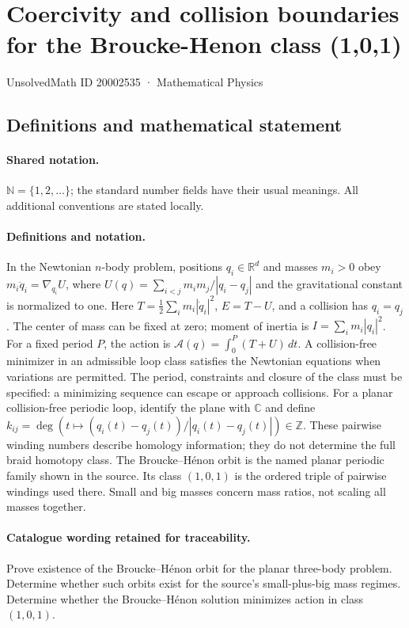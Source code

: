 \documentclass[11pt]{article}
\begin{document}
\setcounter{section}{20002534}
\section{Coercivity and collision boundaries for the Broucke-Henon class (1,0,1)}\label{20002535}
{\small UnsolvedMath ID 20002535 · Mathematical Physics}
\subsection{Definitions and mathematical statement}

\paragraph{Shared notation.}$\mathbb N=\{1,2,\ldots\}$; the standard number fields have their usual meanings. All additional conventions are stated locally.


\paragraph{Definitions and notation.}In the Newtonian $n$-body problem, positions $q_i\in\mathbb R^d$ and masses $m_i>0$ obey $m_i\ddot q_i=\nabla_{q_i}U$, where $U(q)=\sum_{i<j}m_im_j/|q_i-q_j|$ and the gravitational constant is normalized to one. Here $T=\tfrac12\sum_i m_i|\dot q_i|^2$, $E=T-U$, and a collision has $q_i=q_j$. The center of mass can be fixed at zero; moment of inertia is $I=\sum_i m_i|q_i|^2$. For a fixed period $P$, the action is $\mathcal A(q)=\int_0^P(T+U)\,dt$. A collision-free minimizer in an admissible loop class satisfies the Newtonian equations when variations are permitted. The period, constraints and closure of the class must be specified: a minimizing sequence can escape or approach collisions. For a planar collision-free periodic loop, identify the plane with $\mathbb C$ and define $k_{ij}=\deg(t\mapsto(q_i(t)-q_j(t))/|q_i(t)-q_j(t)|)\in\mathbb Z$. These pairwise winding numbers describe homology information; they do not determine the full braid homotopy class. The Broucke--Hénon orbit is the named planar periodic family shown in the source. Its class $(1,0,1)$ is the ordered triple of pairwise windings used there. Small and big masses concern mass ratios, not scaling all masses together.

\paragraph{Catalogue wording retained for traceability.}
Prove existence of the Broucke--Hénon orbit for the planar three-body problem. Determine whether such orbits exist for the source’s small-plus-big mass regimes. Determine whether the Broucke--Hénon solution minimizes action in class $(1,0,1)$.
\end{document}
